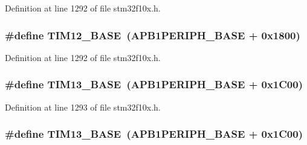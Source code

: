 Definition at line 1292 of file stm32f10x.\+h.

\subsubsection[{\texorpdfstring{T\+I\+M12\+\_\+\+B\+A\+SE}{TIM12_BASE}}]{\setlength{\rightskip}{0pt plus 5cm}\#define T\+I\+M12\+\_\+\+B\+A\+SE~({\bf A\+P\+B1\+P\+E\+R\+I\+P\+H\+\_\+\+B\+A\+SE} + 0x1800)}\hypertarget{group___peripheral__memory__map_ga33dea32fadbaecea161c2ef7927992fd}{}\label{group___peripheral__memory__map_ga33dea32fadbaecea161c2ef7927992fd}


Definition at line 1292 of file stm32f10x.\+h.

\subsubsection[{\texorpdfstring{T\+I\+M13\+\_\+\+B\+A\+SE}{TIM13_BASE}}]{\setlength{\rightskip}{0pt plus 5cm}\#define T\+I\+M13\+\_\+\+B\+A\+SE~({\bf A\+P\+B1\+P\+E\+R\+I\+P\+H\+\_\+\+B\+A\+SE} + 0x1\+C00)}\hypertarget{group___peripheral__memory__map_gad20f79948e9359125a40bbf6ed063590}{}\label{group___peripheral__memory__map_gad20f79948e9359125a40bbf6ed063590}


Definition at line 1293 of file stm32f10x.\+h.

\subsubsection[{\texorpdfstring{T\+I\+M13\+\_\+\+B\+A\+SE}{TIM13_BASE}}]{\setlength{\rightskip}{0pt plus 5cm}\#define T\+I\+M13\+\_\+\+B\+A\+SE~({\bf A\+P\+B1\+P\+E\+R\+I\+P\+H\+\_\+\+B\+A\+SE} + 0x1\+C00)}\hypertarget{group___peripheral__memory__map_gad20f79948e9359125a40bbf6ed063590}{}\label{group___peripheral__memory__map_gad20f79948e9359125a40bbf6ed063590}


